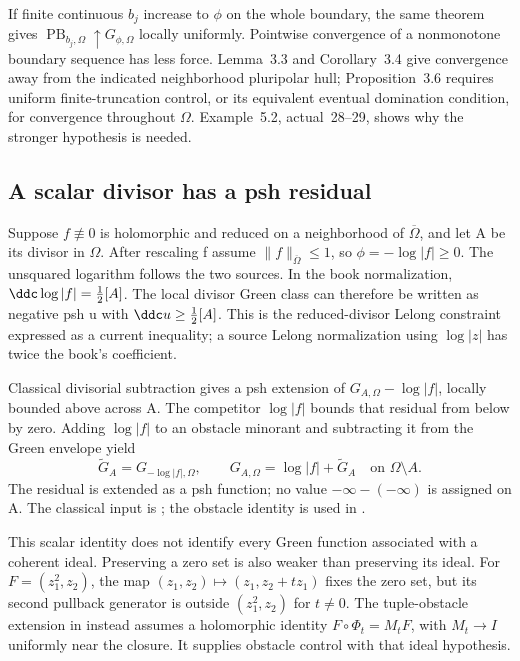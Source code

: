 If finite continuous \(b_j\) increase to \(\phi\) on the whole
boundary, the same theorem gives
\(\operatorname{PB}_{b_j,\Omega}\uparrow G_{\phi,\Omega}\)
locally uniformly. Pointwise convergence of a nonmonotone boundary
sequence has less force. Lemma~3.3 and Corollary~3.4 give convergence
away from the indicated neighborhood pluripolar hull; Proposition~3.6
requires uniform finite-truncation control, or its equivalent eventual
domination condition, for convergence throughout \(\Omega\).
Example~5.2, actual~28--29, shows why the stronger hypothesis is needed.

\subsection{A scalar divisor has a psh residual}
\label{sec:appH-boundary-divisor-residual}

Suppose \(f\not\equiv0\) is holomorphic and reduced on a neighborhood
of \(\overline\Omega\), and let A be its divisor in \(\Omega\).
After rescaling f assume \(\|f\|_{\overline\Omega}\leq1\), so
\(\phi=-\log|f|\geq0\). The unsquared logarithm follows the two
sources. In the book normalization,
\(\ddc\log|f|=\tfrac12[A]\). The local divisor Green class can
therefore be written as negative psh u with
\(\ddc u\geq\tfrac12[A]\). This is the reduced-divisor Lelong
constraint expressed as a current inequality; a source Lelong
normalization using \(\log|z|\) has twice the book's coefficient.

Classical divisorial subtraction gives a psh extension of
\(G_{A,\Omega}-\log|f|\), locally bounded above across A. The
competitor \(\log|f|\) bounds that residual from below by zero.
Adding \(\log|f|\) to an obstacle minorant and subtracting it from
the Green envelope yield
\[
 \widetilde G_A=G_{-\log|f|,\Omega},\qquad
 G_{A,\Omega}=\log|f|+\widetilde G_A\quad\text{on }\Omega\setminus A.
 \tag{H.18}\label{eq:appH-boundary-Green-residual}
\]
The residual is extended as a psh function; no value
\(-\infty-(-\infty)\) is assigned on A. The classical input is
\cite[Proposition~3.2, printed~1525--1526]{LarussonSigurdsson99GreenPublished};
the obstacle identity is used in
\cite[(1.4), actual~3]{DaoNguyen26UnboundedDirichletV1}.

This scalar identity does not identify every Green function associated
with a coherent ideal. Preserving a zero set is also weaker than
preserving its ideal. For \(F=(z_1^2,z_2)\), the map
\((z_1,z_2)\mapsto(z_1,z_2+t z_1)\) fixes the zero set, but its
second pullback generator is outside \((z_1^2,z_2)\) for \(t\ne0\).
The tuple-obstacle extension in
\cite[Proposition~6.1, actual~31]{DaoNguyen26UnboundedDirichletV1}
instead assumes a holomorphic identity
\(F\circ\Phi_t=M_tF\), with \(M_t\to I\) uniformly near the
closure. It supplies obstacle control with that ideal hypothesis.

